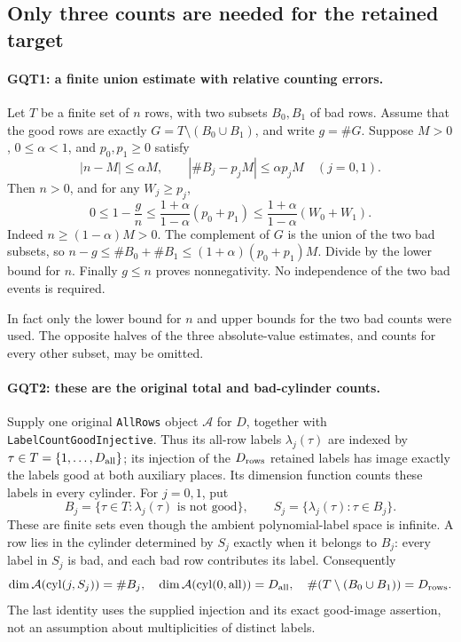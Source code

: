 \subsection{Only three counts are needed for the retained target}

\paragraph{GQT1: a finite union estimate with relative counting errors.}
\label{claim:GQT1}
Let $T$ be a finite set of $n$ rows, with two subsets $B_0,B_1$ of
bad rows. Assume that the good rows are exactly
$G=T\setminus(B_0\cup B_1)$, and write $g=\#G$.
Suppose $M>0$, $0\le\alpha<1$, and $p_0,p_1\ge0$ satisfy
\[
 |n-M|\le\alpha M,\qquad
 |\#B_j-p_jM|\le\alpha p_jM\quad(j=0,1).
\]
Then $n>0$, and for any $W_j\ge p_j$,
\begin{equation}\label{eq:gqt-three-counts}
 0\le1-\frac gn
       \le\frac{1+\alpha}{1-\alpha}(p_0+p_1)
       \le\frac{1+\alpha}{1-\alpha}(W_0+W_1).
\end{equation}
Indeed $n\ge(1-\alpha)M>0$. The complement of $G$ is the union
of the two bad subsets, so $n-g\le\#B_0+\#B_1
\le(1+\alpha)(p_0+p_1)M$. Divide by the lower bound for $n$.
Finally $g\le n$ proves nonnegativity. No independence of the two
bad events is required.

In fact only the lower bound for $n$ and upper bounds for the two
bad counts were used. The opposite halves of the three absolute-value
estimates, and counts for every other subset, may be omitted.

\paragraph{GQT2: these are the original total and bad-cylinder counts.}
\label{claim:GQT2}
Supply one original \texttt{AllRows} object $\mathcal A$ for $D$,
together with \texttt{LabelCountGoodInjective}. Thus its all-row
labels $\lambda_j(\tau)$ are indexed by
$\tau\in T=\{1,\ldots,D_{\rm all}\}$; its injection of the
$D_{\rm rows}$ retained labels has image exactly the labels good
at both auxiliary places. Its dimension function counts these
labels in every cylinder. For $j=0,1$, put
\[
 B_j=\{\tau\in T:\lambda_j(\tau)\text{ is not good}\},
 \qquad S_j=\{\lambda_j(\tau):\tau\in B_j\}.
\]
These are finite sets even though the ambient polynomial-label space
is infinite. A row lies in the cylinder determined by $S_j$ exactly
when it belongs to $B_j$: every label in $S_j$ is bad, and each bad
row contributes its label. Consequently
\[
 \dim\mathcal A(\mathrm{cyl}(j,S_j))=\#B_j,
 \quad \dim\mathcal A(\mathrm{cyl}(0,\mathrm{all}))=D_{\rm all},
 \quad\#(T\setminus(B_0\cup B_1))=D_{\rm rows}.
\]
The last identity uses the supplied injection and its exact
good-image assertion, not an assumption about multiplicities of
distinct labels.

